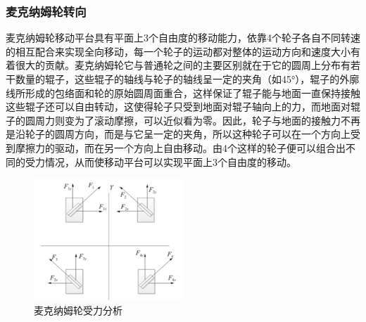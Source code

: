 \documentclass{paper}
\begin{document}
\subsubsection{麦克纳姆轮转向\cite{mac}}
\label{subsec:label}
麦克纳姆轮移动平台具有平面上3个自由度的移动能力，依靠4个轮子各自不同转速的相互配合来实现全向移动，每一个轮子的运动都对整体的运动方向和速度大小有着很大的贡献。麦克纳姆轮它与普通轮之间的主要区别就在于它的圆周上分布有若干数量的辊子，这些辊子的轴线与轮子的轴线呈一定的夹角（如45°），辊子的外廓线所形成的包络面和轮的原始圆周面重合，这样保证了辊子能与地面一直保持接触这些辊子还可以自由转动，这使得轮子只受到地面对辊子轴向上的力，而地面对辊子的圆周力则变为了滚动摩擦，可以近似看为零。因此，轮子与地面的接触力不再是沿轮子的圆周方向，而是与它呈一定的夹角，所以这种轮子可以在一个方向上受到摩擦力的驱动，而在另一个方向上自由移动。由4个这样的轮子便可以组合出不同的受力情况，从而使移动平台可以实现平面上3个自由度的移动。
\begin{figure}[ht]
  \centering
  \includegraphics[width=0.5\textwidth]{figures/mac.png}
  \caption{麦克纳姆轮受力分析 }
\end{figure}
\end{document}
